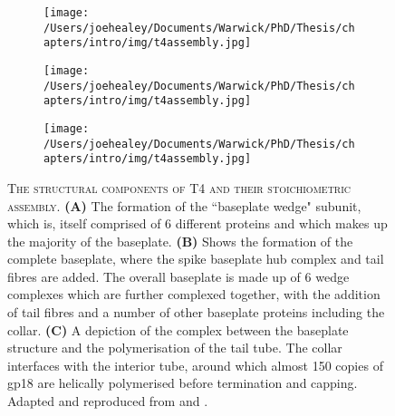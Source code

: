 \begin{figure}[p]
\centering
    \begin{subfigure}[h]{\textwidth}
        \centering                                                     %
        \texttt{[image: /Users/joehealey/Documents/Warwick/PhD/Thesis/chapters/intro/img/t4assembly.jpg]}
        \captionsetup{singlelinecheck=off, justification=centering, font=footnotesize, aboveskip=15pt, belowskip=10pt}
        \caption{}
        \label{wedgeformation}
    \end{subfigure}%

    \begin{subfigure}[h]{\textwidth}
        \centering
        \texttt{[image: /Users/joehealey/Documents/Warwick/PhD/Thesis/chapters/intro/img/t4assembly.jpg]}
        \captionsetup{singlelinecheck=off, justification=centering, font=footnotesize, aboveskip=15pt, belowskip=10pt}
        \caption{}
        \label{baseplateformation}
    \end{subfigure}%
 
    \begin{subfigure}[h]{\textwidth}
        \centering
        \texttt{[image: /Users/joehealey/Documents/Warwick/PhD/Thesis/chapters/intro/img/t4assembly.jpg]}
        \captionsetup{singlelinecheck=off, justification=centering, font=footnotesize, aboveskip=15pt, belowskip=10pt}
        \caption{}
        \label{tubeformation}
    \end{subfigure}%

	\captionsetup{singlelinecheck=off, justification=justified, font=footnotesize, aboveskip=10pt}
	\caption[Assembly of the T4 phage tube and baseplate]{\textsc{\normalsize The structural components of T4 and their stoichiometric assembly.} \vspace{0.1cm} \newline \textbf{(A)} The formation of the  ``baseplate wedge" subunit, which is, itself comprised of 6 different proteins and which makes up the majority of the baseplate. \textbf{(B)} Shows the formation of the complete baseplate, where the spike baseplate hub complex and tail fibres are added. The overall baseplate is made up of 6 wedge complexes which are further complexed together, with the addition of tail fibres and a number of other baseplate proteins including the collar. \textbf{(C)} A depiction of the complex between the baseplate structure and the polymerisation of the tail tube. The collar interfaces with the interior tube, around which almost 150 copies of gp18 are helically polymerised before termination and capping. Adapted and reproduced from \cite{Leiman2004} and \cite{Yap2014a}.}
	\label{t4assemblyflowchart}
\end{figure}

